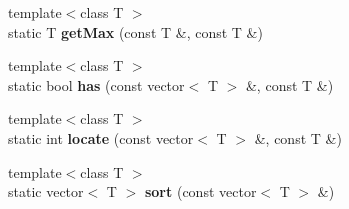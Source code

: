 \begin{DoxyCompactItemize}
\item 
\hypertarget{classHelper_a177327a86b2bbd9ec4c2df38a19743e5}{
{\footnotesize template$<$class T $>$ }\\static T {\bfseries getMax} (const T \&, const T \&)}
\label{classHelper_a177327a86b2bbd9ec4c2df38a19743e5}

\item 
\hypertarget{classHelper_ad314c7f6cf810c8da0d8771a55fe2bc0}{
{\footnotesize template$<$class T $>$ }\\static bool {\bfseries has} (const vector$<$ T $>$ \&, const T \&)}
\label{classHelper_ad314c7f6cf810c8da0d8771a55fe2bc0}

\item 
\hypertarget{classHelper_af83c5cf77492aebbce4aa0992741fa3f}{
{\footnotesize template$<$class T $>$ }\\static int {\bfseries locate} (const vector$<$ T $>$ \&, const T \&)}
\label{classHelper_af83c5cf77492aebbce4aa0992741fa3f}

\item 
\hypertarget{classHelper_a7488811eef8f8d2c393e182c1c22ea33}{
{\footnotesize template$<$class T $>$ }\\static vector$<$ T $>$ {\bfseries sort} (const vector$<$ T $>$ \&)}
\label{classHelper_a7488811eef8f8d2c393e182c1c22ea33}


\end{DoxyCompactItemize}
